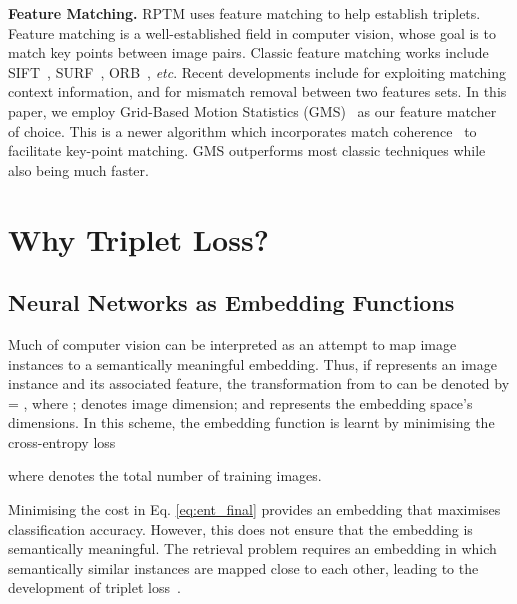 \documentclass[10pt,twocolumn,letterpaper]{article}
\begin{document}
\textbf{Feature Matching.}
RPTM uses feature matching to help establish triplets. 
Feature matching is a well-established field in computer vision, whose goal is to match key points between image pairs. 
Classic feature matching works include SIFT~\cite{lowe1999object},  SURF~\cite{bay2006surf}, ORB~\cite{rublee2011orb}, \textit{etc}.
Recent developments include \cite{bellavia2022sift} for exploiting matching context information, and \cite{ma2022feature} for mismatch removal between two features sets. 
In this paper, we employ Grid-Based Motion Statistics (GMS)~\cite{bian2017gms}  as our feature matcher of choice. 
This is a newer algorithm which incorporates match coherence~\cite{lin2014bilateral} to facilitate  key-point matching.  
GMS outperforms most classic techniques while also being much faster.    

\section{Why Triplet Loss?}


\subsection{Neural Networks as Embedding Functions}

Much of computer vision can be interpreted as an attempt to map 
image instances to a semantically meaningful embedding. Thus,
if  represents an image instance and  its associated feature,
the transformation from  to    can be denoted by  = , where ;     denotes  image  dimension; 
and   represents the embedding space's dimensions. In this scheme, the embedding function  is learnt by minimising the cross-entropy loss 

where  denotes the total number of training images. 

Minimising the cost in Eq. \ref{eq:ent_final}  provides an embedding that maximises classification accuracy.
 However, this does not ensure that the embedding is semantically meaningful. The retrieval problem
 requires an embedding in which semantically similar instances are 
mapped close to each other, leading to the development of triplet loss~\cite{schroff2015facenet}.   
\end{document}
